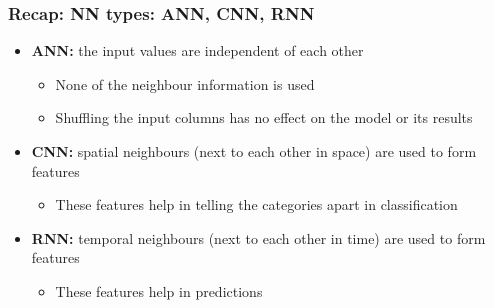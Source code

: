 \begin{frame}[fragile] \frametitle{Recap: NN types: ANN, CNN, RNN}

\begin{itemize}
\item \textbf{ANN:} the input values are independent of each other
  \begin{itemize}
  \item None of the neighbour information is used
  \item Shuffling the input columns has no effect on the model or its results
  \end{itemize}
\item \textbf{CNN:} spatial neighbours (next to each other in space) are used to form features
  \begin{itemize}
  \item These features help in telling the categories apart in classification
  \end{itemize}
\item \textbf{RNN:} temporal neighbours (next to each other in time) are used to form features
  \begin{itemize}
  \item These features help in predictions
  \end{itemize}
\end{itemize}

\end{frame}






